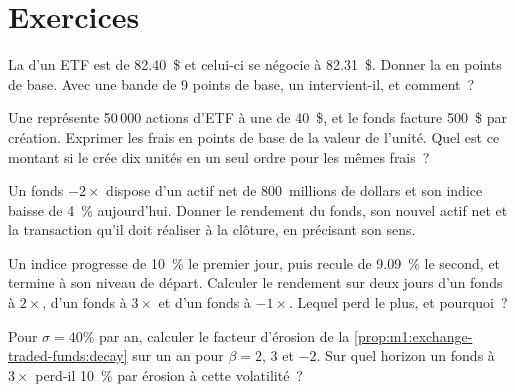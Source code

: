 \section{Exercices}

\begin{exercise}[$\star$]\label{exo:m1:exchange-traded-funds:1}
La  d'un ETF est de 82.40~\$ et celui-ci se négocie à 82.31~\$. Donner la  en
points de base. Avec une bande de 9 points de base, un  intervient-il,
et comment~?
\end{exercise}

\begin{exercise}[$\star$]\label{exo:m1:exchange-traded-funds:2}
Une  représente 50\,000 actions d'ETF à une  de 40~\$, et le fonds facture
500~\$ par création. Exprimer les frais en points de base de la valeur de l'unité. Quel
est ce montant si le  crée dix unités en un seul ordre pour les mêmes frais~?
\end{exercise}

\begin{exercise}[$\star$]\label{exo:m1:exchange-traded-funds:3}
Un fonds $-2\times$ dispose d'un actif net de 800~millions de dollars et son indice baisse de 4~\%
aujourd'hui. Donner le rendement du fonds, son nouvel actif net et la transaction
qu'il doit réaliser à la clôture, en précisant son sens.
\end{exercise}

\begin{exercise}[$\star\star$]\label{exo:m1:exchange-traded-funds:4}
Un indice progresse de 10~\% le premier jour, puis recule de 9.09~\% le second, et termine
à son niveau de départ. Calculer le rendement sur deux jours d'un fonds à $2\times$, d'un fonds à $3\times$ et
d'un fonds à $-1\times$. Lequel perd le plus, et pourquoi~?
\end{exercise}

\begin{exercise}[$\star\star$]\label{exo:m1:exchange-traded-funds:5}
Pour $\sigma = 40\%$ par an, calculer le facteur d'érosion de la
\cref{prop:m1:exchange-traded-funds:decay} sur un an pour $\beta = 2$, $3$
et $-2$. Sur quel horizon un fonds à $3\times$ perd-il 10~\% par érosion à cette
volatilité~?
\end{exercise}

